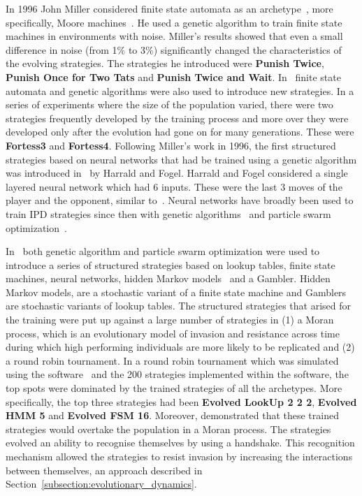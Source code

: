 \documentclass{article}
\theoremstyle{definition}
\begin{document}
In 1996 John Miller considered finite state automata as an
archetype~\cite{Miller1996}, more specifically, Moore
machines~\cite{moore1956}. He used a genetic algorithm to train finite state
machines in environments with noise. Miller's results showed that even a small
difference in noise (from 1\% to 3\%) significantly changed the characteristics
of the evolving strategies. The strategies he introduced were \textbf{Punish
Twice}, \textbf{Punish Once for Two Tats} and \textbf{Punish Twice and Wait}.
In~\cite{Ashlock2006b} finite state automata and genetic algorithms were also
used to introduce new strategies. In a series of experiments where the size of
the population varied, there were two strategies frequently developed by the
training process and more over they were developed only after the evolution had
gone on for many generations. These were \textbf{Fortess3} and
\textbf{Fortess4}.
Following Miller's work in 1996, the first structured strategies based on neural
networks that had be trained using a genetic algorithm was introduced
in~\cite{Harrald1996} by Harrald and Fogel. Harrald and Fogel considered a
single layered neural network which had 6 inputs. These were the last 3 moves of
the player and the opponent, similar to~\cite{Axelrod1987}. Neural networks have
broadly been used to train IPD strategies since then with genetic
algorithms~\cite{Ashlock2006a, Chong2005, Marks1999} and particle swarm
optimization~\cite{Franken2005}.

In~\cite{Knight2017, KnightHGC17} both genetic algorithm and particle swarm
optimization were used to introduce a series of structured strategies based on
lookup tables, finite state machines, neural networks, hidden Markov
models~\cite{eddy1996} and a Gambler. Hidden Markov models, are a stochastic
variant of a finite state machine and Gamblers are stochastic variants of lookup
tables. The structured strategies that arised for the training were put up
against a large number of strategies in (1) a Moran process, which is an
evolutionary model of invasion and resistance across time during which high
performing individuals are more likely to be replicated and (2)
a round robin tournament. In a round robin tournament which was simulated using the
software~\cite{axelrodproject} and the 200 strategies implemented within the
software, the top spots were dominated by the trained strategies of all the
archetypes. More specifically, the top three strategies had been \textbf{Evolved
LookUp 2 2 2}, \textbf{Evolved HMM 5} and \textbf{Evolved FSM 16}. Moreover,
\cite{KnightHGC17} demonstrated that these trained strategies
would overtake the population in a Moran process. The strategies evolved an ability
to recognise themselves by using a handshake. This recognition mechanism allowed the strategies
to resist invasion by increasing the interactions between themselves, an approach described
in Section~\ref{subsection:evolutionary_dynamics}.
\end{document}
